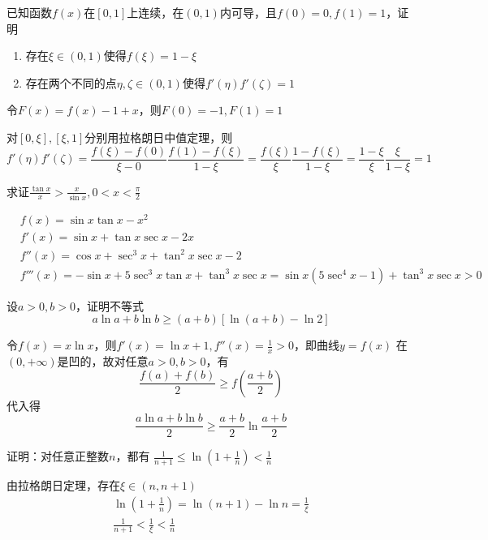 \documentclass{article}
\begin{document}
\begin{examplle}[]
已知函数\(f(x)\)在\([0,1]\)上连续，在\((0,1)\)内可导，且\(f(0)=0,f(1)=1\)，证
明
\begin{enumerate}
\item 存在\(\xi\in(0,1)\)使得\(f(\xi)=1-\xi\)
\item 存在两个不同的点\(\eta,\zeta\in(0,1)\)使得\(f'(\eta)f'(\zeta)=1\)
\end{enumerate}


令\(F(x)=f(x)-1+x\)，则\(F(0)=-1,F(1)=1\)

对\([0,\xi],[\xi,1]\)分别用拉格朗日中值定理，则
\begin{equation*}
f'(\eta)f'(\zeta)=\frac{f(\xi)-f(0)}{\xi-0}\frac{f(1)-f(\xi)}{1-\xi}=
\frac{f(\xi)}{\xi}\frac{1-f(\xi)}{1-\xi}=
\frac{1-\xi}{\xi}\frac{\xi}{1-\xi}=1
\end{equation*}
\end{examplle}

\begin{examplle}[]
求证\(\frac{\tan x}{x}>\frac{x}{\sin x},0<x<\frac{\pi}{2}\)

\begin{align*}
&f(x)=\sin x\tan x-x^2\\
&f'(x)=\sin x+\tan x\sec x-2x\\
&f''(x)=\cos x+\sec^3x+\tan^2x\sec x-2\\
&f'''(x)=-\sin x+5\sec^3x\tan x+\tan^3x\sec x=
\sin x(5\sec^4x-1)+\tan^3x\sec x>0
\end{align*}
\end{examplle}

\begin{examplle}[]
设\(a>0,b>0\)，证明不等式
\begin{equation*}
a\ln a+b\ln b\ge(a+b)[\ln(a+b)-\ln2]
\end{equation*}

令\(f(x)=x\ln x\)，则\(f'(x)=\ln x+1,f''(x)=\frac{1}{x}>0\)，即曲线\(y=f(x)\)
在\((0,+\infty)\)是凹的，故对任意\(a>0,b>0\)，有
\begin{equation*}
\frac{f(a)+f(b)}{2}\ge f(\frac{a+b}{2})
\end{equation*}
代入得
\begin{equation*}
\frac{a\ln a+b\ln b}{2}\ge\frac{a+b}{2}\ln\frac{a+b}{2}
\end{equation*}
\end{examplle}

\begin{examplle}[]
证明：对任意正整数\(n\)，都有
\(\frac{1}{n+1}\le\ln(1+\frac{1}{n})<\frac{1}{n}\)

由拉格朗日定理，存在\(\xi\in(n,n+1)\)
\begin{gather*}
\ln(1+\frac{1}{n})=\ln(n+1)-\ln n=\frac{1}{\xi}\\
\frac{1}{n+1}<\frac{1}{\xi}<\frac{1}{n}
\end{gather*}
\end{examplle}
\end{document}
